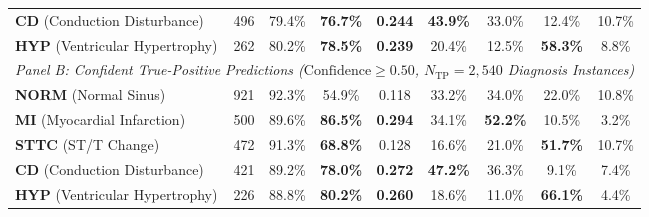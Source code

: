 \documentclass[5p,twocolumn,10pt]{elsarticle}
\begin{document}
\begin{table}[t]
{\begin{tabular}{lcccccccc}
\textbf{CD} (Conduction Disturbance) & 496 & 79.4\% & \textbf{76.7\%} & \textbf{0.244} & \textbf{43.9\%} & 33.0\% & 12.4\% & 10.7\% \\
\textbf{HYP} (Ventricular Hypertrophy) & 262 & 80.2\% & \textbf{78.5\%} & \textbf{0.239} & 20.4\% & 12.5\% & \textbf{58.3\%} & 8.8\% \\
\midrule
\multicolumn{9}{l}{\textit{Panel B: Confident True-Positive Predictions ($\text{Confidence} \ge 0.50$, $N_{\text{TP}} = 2,540$ Diagnosis Instances)}} \\
\midrule
\textbf{NORM} (Normal Sinus) & 921 & 92.3\% & 54.9\% & 0.118 & 33.2\% & 34.0\% & 22.0\% & 10.8\% \\
\textbf{MI} (Myocardial Infarction) & 500 & 89.6\% & \textbf{86.5\%} & \textbf{0.294} & 34.1\% & \textbf{52.2\%} & 10.5\% & 3.2\% \\
\textbf{STTC} (ST/T Change) & 472 & 91.3\% & \textbf{68.8\%} & 0.128 & 16.6\% & 21.0\% & \textbf{51.7\%} & 10.7\% \\
\textbf{CD} (Conduction Disturbance) & 421 & 89.2\% & \textbf{78.0\%} & \textbf{0.272} & \textbf{47.2\%} & 36.3\% & 9.1\% & 7.4\% \\
\textbf{HYP} (Ventricular Hypertrophy) & 226 & 88.8\% & \textbf{80.2\%} & \textbf{0.260} & 18.6\% & 11.0\% & \textbf{66.1\%} & 4.4\% \\
\bottomrule
\end{tabular}%
}
\end{table}
\end{document}
